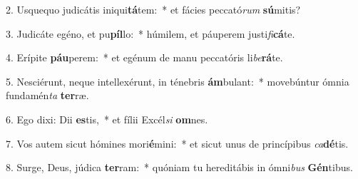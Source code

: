 2. Usquequo judicátis iniqui\textbf{tá}tem:~*  et fácies peccató\textit{rum} \textbf{sú}mitis?\

3. Judicáte egéno, et pu\textbf{píl}lo:~*  húmilem, et páuperem justi\textit{fi}\textbf{cá}te.\

4. Erípite \textbf{páu}perem:~*  et egénum de manu peccatóris li\textit{be}\textbf{rá}te.\

5. Nesciérunt, neque intellexérunt, in ténebris \textbf{ám}bulant:~*  movebúntur ómnia fundamén\textit{ta} \textbf{ter}ræ.\

6. Ego dixi: Dii \textbf{es}tis,~*  et fílii Excél\textit{si} \textbf{om}nes.\

7. Vos autem sicut hómines mori\textbf{é}mini:~*  et sicut unus de princípibus \textit{ca}\textbf{dé}tis.\

8. Surge, Deus, júdica \textbf{ter}ram:~*  quóniam tu hereditábis in ómni\textit{bus} \textbf{Gén}tibus.\

